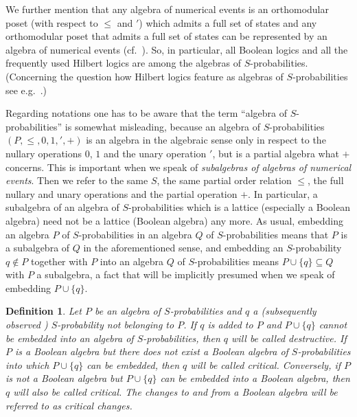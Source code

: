 \documentclass[12pt]{article}
\newtheorem{definition}[theorem]{Definition}
\begin{document}
We further mention that any algebra of numerical events is an orthomodular poset (with respect to $\le$ and $'$) which admits a full set of states and any orthomodular poset that admits a full set of states can be represented by an algebra of numerical events (cf.\ \cite{MT}). So, in particular, all Boolean logics and all the frequently used Hilbert logics are among the algebras of $S$-probabilities. (Concerning the question how Hilbert logics feature as algebras of $S$-probabilities see e.g.\ \cite{DLM}.)

Regarding notations one has to be aware that the term ``algebra of $S$-probabilities'' is somewhat misleading, because an algebra of $S$-probabilities $(P,\le,0,1,{}',+)$ is an algebra in the algebraic sense only in respect to the nullary operations $0$, $1$ and the unary operation $'$, but is a partial algebra what $+$ concerns. This is important when we speak of {\em subalgebras of algebras of numerical events}. Then we refer to the same $S$, the same partial order relation $\le$, the full nullary and unary operations and the partial operation $+$. In particular, a subalgebra of an algebra of $S$-probabilities which is a lattice (especially a Boolean algebra) need not be a lattice (Boolean algebra) any more. As usual, embedding an algebra $P$ of $S$-probabilities in an algebra $Q$ of $S$-probabilities means that $P$ is a subalgebra of $Q$ in the aforementioned sense, and embedding an $S$-probability $q\notin P$ together with $P$ into an algebra $Q$ of $S$-probabilities means $P\cup\{q\}\subseteq Q$ with $P$ a subalgebra, a fact that will be implicitly presumed when we speak of embedding $P\cup\{q\}$.

\begin{definition}\label{def2}
Let $P$ be an algebra of $S$-probabilities and $q$ a {\rm(}subsequently observed {\rm)} $S$-probability not belonging to $P$. If $q$ is added to $P$ and $P\cup\{q\}$ cannot be embedded into an algebra of $S$-probabilities, then $q$ will be called {\em destructive}. If $P$ is a Boolean algebra but there does not exist a Boolean algebra of $S$-probabilities into which $P\cup\{q\}$ can be embedded, then $q$ will be called {\em critical}. Conversely, if $P$ is not a Boolean algebra but $P\cup\{q\}$ can be embedded into a Boolean algebra, then $q$ will also be called {\em critical}. The changes to and from a Boolean algebra will be referred to as {\em critical changes}.
\end{definition}
\end{document}
